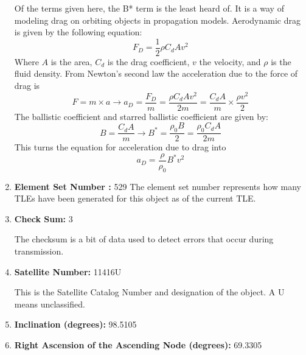 \documentclass[12pt]{article}
\begin{document}
\begin{enumerate}
		Of the terms given here, the B* term is the least heard of. It is a way of modeling drag on orbiting objects in propagation models.  
		Aerodynamic drag is given by the following equation:
		\begin{equation}
		F_D = \frac{1}{2}\rho C_d A v^2
		\end{equation}
		Where $A$ is the area, $C_d$ is the drag coefficient, $v$ the velocity, and $\rho$ is the fluid density. From Newton's second law
		the acceleration due to the force of drag is 
		\begin{equation}
		F = m\times a\rightarrow a_D=\frac{F_D}{m}=\frac{\rho C_d A v^2}{2m}=\frac{ C_d A}{m}\times\frac{\rho v^2}{2}
		\end{equation}
		The ballistic coefficient and starred ballistic coefficient are given by:
		\begin{equation}
		B=\frac{ C_d A}{m}\rightarrow B^{*} = \frac{\rho_0 B}{2}=\frac{\rho_0 C_d A}{2m}
		\end{equation}
		This turns the equation for acceleration due to drag into \cite{celestrak_TLE_FAQ}\cite{castor2_BSTAR}
		\begin{equation}
		a_D=\frac{\rho}{\rho_0}B^{*} v^2
		\end{equation}
		\item \textbf{Element Set Number :} 529
		The element set number represents how many TLEs have been generated for this object as of the current TLE.
		
		\item \textbf{Check Sum: } 3
		
		The checksum is a bit of data used to detect errors that occur during  transmission.
		
		\item \textbf{Satellite Number: } 11416U
		
		This is the Satellite Catalog Number and designation of the object. A U means unclassified. 
		
		\item \textbf{Inclination (degrees): }98.5105
		
		\item \textbf{Right Ascension of the Ascending Node (degrees): }69.3305
		

\end{enumerate}
\end{document}
